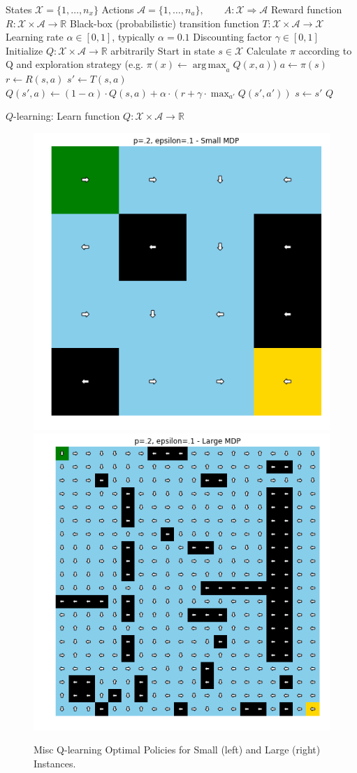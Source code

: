 \documentclass[letter]{article}
\DeclareMathOperator*{\argmax}{arg\,max}
\begin{document}
\begin{algorithm}[H]
    \begin{algorithmic}
    \Require
    \Statex States $\mathcal{X} = \{1, \dots, n_x\}$
    \Statex Actions $\mathcal{A} = \{1, \dots, n_a\},\qquad A: \mathcal{X} \Rightarrow \mathcal{A}$
    \Statex Reward function $R: \mathcal{X} \times \mathcal{A} \rightarrow \mathbb{R}$
    \Statex Black-box (probabilistic) transition function $T: \mathcal{X} \times \mathcal{A} \rightarrow \mathcal{X}$
    \Statex Learning rate $\alpha \in [0, 1]$, typically $\alpha = 0.1$
    \Statex Discounting factor $\gamma \in [0, 1]$
        \State Initialize $Q: \mathcal{X} \times \mathcal{A} \rightarrow \mathbb{R}$ arbitrarily
            \State Start in state $s \in \mathcal{X}$
                \State Calculate $\pi$ according to Q and exploration strategy (e.g. $\pi(x) \gets \argmax_{a} Q(x, a)$)
                \State $a \gets \pi(s)$
                \State $r \gets R(s, a)$ 
                \State $s' \gets T(s, a)$ 
                \State $Q(s', a) \gets (1 - \alpha) \cdot Q(s, a) + \alpha \cdot (r + \gamma \cdot \max_{a'} Q(s', a'))$
                \State $s \gets s'$
            \EndWhile
        \EndWhile
        \Return $Q$
    \EndProcedure
    \end{algorithmic}
\caption{$Q$-learning: Learn function $Q: \mathcal{X} \times \mathcal{A} \rightarrow \mathbb{R}$}
\label{alg:q-learning}
\end{algorithm}

\begin{figure}[]
    \centering
    \includegraphics[width=.4\linewidth]{qlearn_small_ol.png}
    \includegraphics[width=.4\linewidth]{qlearn_large_ol.png}
    \caption{Misc Q-learning Optimal Policies for Small (left) and Large (right) Instances.}
    \label{polq}
\end{figure}
\end{document}
